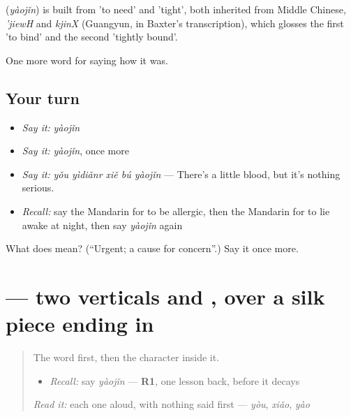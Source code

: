 \begin{cousinweb}
\textbf{} (\emph{yàojǐn}) is built from  'to need' and  'tight', both inherited from Middle Chinese, \emph{'jiewH} and \emph{kjinX} (Guangyun, in Baxter's transcription), which glosses the first 'to bind' and the second 'tightly bound'.
\end{cousinweb}

\begin{grammarlens}[title={What you've built}]
One more word for saying how it was.
\end{grammarlens}

\subsection*{Your turn}
\begin{itemize}
\raggedright
  \item \emph{Say it:} \emph{yàojǐn}
  \item \emph{Say it:} \emph{yàojǐn}, once more
  \item \emph{Say it:} \emph{yǒu yìdiǎnr xiě bú yàojǐn} — There's a little blood, but it's nothing serious.
  \item \emph{Recall:} say the Mandarin for to be allergic, then the Mandarin for to lie awake at night, then say \emph{yàojǐn} again
\end{itemize}

\begin{tcolorbox}[breakable,colback=teal!4,colframe=teal!35!black,title={Before you move on}]
What does  mean? (\textquotedblleft{}Urgent; a cause for concern\textquotedblright{}.) Say it once more.
\end{tcolorbox}
\section[\texorpdfstring{\zh{紧} (jǐn)}{紧 (jǐn)}]{ — two verticals and , over a silk piece ending in }

\label{lesson:ZH-W481-jin-tight}



\begin{quote}
The word first, then the character inside it.

\begin{itemize}
\raggedright
  \item \emph{Recall:} say \emph{yàojǐn} — \textbf{R1}, one lesson back, before it decays
\end{itemize}

\begin{quote}
  
\end{quote}

\emph{Read it:} each one aloud, with nothing said first — \emph{yòu}, \emph{xiǎo}, \emph{yào}
\end{quote}

